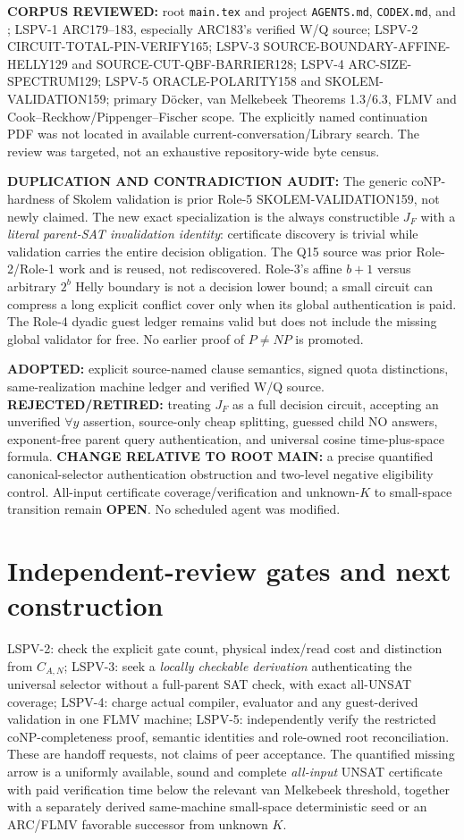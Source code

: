 \documentclass[11pt]{article}
\newcommand{\OPEN}{\textbf{OPEN}}
\begin{document}
\noindent\textbf{CORPUS REVIEWED:} root \texttt{main.tex} and project \texttt{AGENTS.md}, \texttt{CODEX.md}, and ; LSPV-1 ARC179--183, especially ARC183's verified W/Q source; LSPV-2 CIRCUIT-TOTAL-PIN-VERIFY165; LSPV-3 SOURCE-BOUNDARY-AFFINE-HELLY129 and SOURCE-CUT-QBF-BARRIER128; LSPV-4 ARC-SIZE-SPECTRUM129; LSPV-5 ORACLE-POLARITY158 and SKOLEM-VALIDATION159; primary D\"ocker, van Melkebeek Theorems 1.3/6.3, FLMV and Cook--Reckhow/Pippenger--Fischer scope. The explicitly named continuation PDF was not located in available current-conversation/Library search. The review was targeted, not an exhaustive repository-wide byte census.

\noindent\textbf{DUPLICATION AND CONTRADICTION AUDIT:} The generic coNP-hardness of Skolem validation is prior Role-5 SKOLEM-VALIDATION159, not newly claimed. The new exact specialization is the always constructible $J_F$ with a \emph{literal parent-SAT invalidation identity}: certificate discovery is trivial while validation carries the entire decision obligation. The Q15 source was prior Role-2/Role-1 work and is reused, not rediscovered. Role-3's affine $b+1$ versus arbitrary $2^b$ Helly boundary is not a decision lower bound; a small circuit can compress a long explicit conflict cover only when its global authentication is paid. The Role-4 dyadic guest ledger remains valid but does not include the missing global validator for free. No earlier proof of $P\ne NP$ is promoted.

\noindent\textbf{ADOPTED:} explicit source-named clause semantics, signed quota distinctions, same-realization machine ledger and verified W/Q source. \textbf{REJECTED/RETIRED:} treating $J_F$ as a full decision circuit, accepting an unverified $\forall y$ assertion, source-only cheap splitting, guessed child NO answers, exponent-free parent query authentication, and universal cosine time-plus-space formula. \textbf{CHANGE RELATIVE TO ROOT MAIN:} a precise quantified canonical-selector authentication obstruction and two-level negative eligibility control. All-input certificate coverage/verification and unknown-$K$ to small-space transition remain \OPEN. No scheduled agent was modified.

\section{Independent-review gates and next construction}
LSPV-2: check the explicit gate count, physical index/read cost and distinction from $C_{A,N}$; LSPV-3: seek a \emph{locally checkable derivation} authenticating the universal selector without a full-parent SAT check, with exact all-UNSAT coverage; LSPV-4: charge actual compiler, evaluator and any guest-derived validation in one FLMV machine; LSPV-5: independently verify the restricted coNP-completeness proof, semantic identities and role-owned root reconciliation. These are handoff requests, not claims of peer acceptance. The quantified missing arrow is a uniformly available, sound and complete \emph{all-input} UNSAT certificate with paid verification time below the relevant van Melkebeek threshold, together with a separately derived same-machine small-space deterministic seed or an ARC/FLMV favorable successor from unknown $K$.



\end{document}
